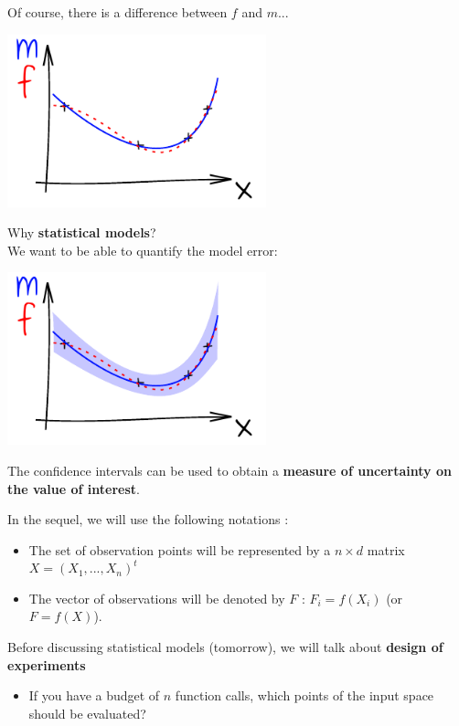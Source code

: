 \documentclass{beamer}
\begin{document}
\begin{frame}{}
Of course, there is a difference between $f$ and $m$...
\begin{center}
\includegraphics[height=5cm]{figures/ink_mf}
\end{center}
\end{frame}

\begin{frame}{}
Why \textbf{statistical models}? \\We want to be able to quantify the model error:
\begin{center}
\includegraphics[height=5cm]{figures/ink_mconfint}
\end{center}
The confidence intervals can be used to obtain a \textbf{measure of uncertainty on the value of interest}.
\end{frame}

\begin{frame}{}
In the sequel, we will use the following notations : 
\begin{itemize}
	\item The set of observation points will be represented by a $n \times d$ matrix $X=(X_1, ..., X_n)^t$
	\item The vector of observations will be denoted by $F$ : $F_i=f(X_i)$ (or $F=f(X)$).
\end{itemize}
    Before discussing statistical models (tomorrow), we will talk about \textbf{design of experiments}
\begin{itemize}
    \item[] If you have a budget of $n$ function calls, which points of the input space should be evaluated?
\end{itemize}
\end{frame}
\end{document}
